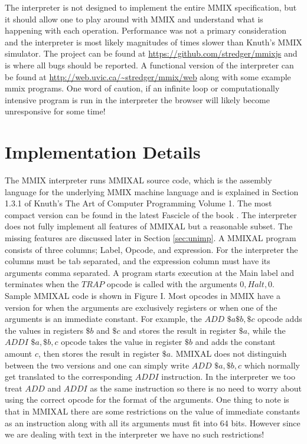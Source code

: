 \documentclass[conference]{IEEEtran}
\begin{document}
The interpreter is not designed to implement the entire MMIX specification, but it should allow one to play around with MMIX and understand what is happening with each operation. Performance was not a primary consideration and the interpreter is most likely magnitudes of times slower than Knuth’s MMIX simulator. The project can be found at \url{https://github.com/stredger/mmixjs} and is where all bugs should be reported. A functional version of the interpreter can be found at \url{http://web.uvic.ca/~stredger/mmix/web} along with some example mmix programs. One word of caution, if an infinite loop or computationally intensive program is run in the interpreter the browser will likely become unresponsive for some time!


\vspace{0.5cm}
\section{Implementation Details}
\label{sec:impl}

The MMIX interpreter runs MMIXAL source code, which is the assembly language for the underlying MMIX machine language and is explained in Section 1.3.1 of Knuth's The Art of Computer Programming Volume 1. The most compact version can be found in the latest Fascicle of the book \cite{mmixfasc}. The interpreter does not fully implement all features of MMIXAL but a reasonable subset. The missing features are discussed later in Section \ref{sec:unimp}. A MMIXAL program consists of three columns; Label, Opcode, and expression. For the interpreter the columns must be tab separated, and the expression column must have its arguments comma separated. A program starts execution at the Main label and terminates when the $TRAP$ opcode is called with the arguments $0,Halt,0$. Sample MMIXAL code is shown in Figure I. Most opcodes in MMIX have a version for when the arguments are exclusively registers or when one of the arguments is an immediate constant. For example, the $ADD$ $\$a\$b,\$c$ opcode adds the values in registers $\$b$ and $\$c$ and stores the result in register $\$a$, while the $ADDI$ $\$a,\$b,c$ opcode takes the value in register $\$b$ and adds the constant amount $c$, then stores the result in register $\$a$. MMIXAL does not distinguish between the two versions and one can simply write $ADD$ $\$a,\$b,c$ which normally get translated to the corresponding $ADDI$ instruction. In the interpreter we too treat $ADD$ and $ADDI$ as the same instruction so there is no need to worry about using the correct opcode for the format of the arguments. One thing to note is that in MMIXAL there are some restrictions on the value of immediate constants as an instruction along with all its arguments must fit into 64 bits. However since we are dealing with text in the interpreter we have no such restrictions!
\end{document}
